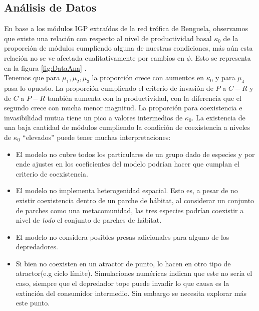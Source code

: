 \subsection{An\'alisis de Datos}
En base a los m\'odulos IGP extra\'idos de la red tr\'ofica de Benguela, observamos que existe una relaci\'on con respecto al nivel de productividad basal $\kappa_0$ de la proporci\'on de m\'odulos cumpliendo alguna de nuestras condiciones, m\'as a\'un esta relaci\'on no se ve afectada cualitativamente por cambios en $\phi$. Esto se representa en la figura \ref{fig:DataAna} . \\
Tenemos que para $\mu_1, \mu_2 , \mu_3$  la proporci\'on crece con aumentos en $\kappa_0$ y para $\mu_4$ pasa lo opuesto. La proporci\'on cumpliendo el criterio de invasi\'on de $P$ a $C-R$ y de $C$ a $P-R$ tambi\'en aumenta con la productividad, con la diferencia que el segundo crece con mucha menor magnitud. La proporci\'on para coexistencia e invasibilidad mutua tiene un pico a valores intermedios de $\kappa_0$. La existencia de una baja cantidad de m\'odulos cumpliendo la condici\'on de coexistencia a niveles de $\kappa_0$ ``elevados'' puede tener muchas interpretaciones:
\begin{itemize}
\item  El modelo no cubre todos los particulares de un grupo dado de especies y por ende ajustes en los coeficientes del modelo podr\'ian hacer que cumplan el criterio de coexistencia.
\item El modelo no implementa heterogenidad espacial. Esto es, a pesar de no existir coexistencia dentro de un parche de h\'abitat, al considerar un conjunto de parches como una metacomunidad, las tres especies podr\'ian coexistir a nivel de \emph{todo} el conjunto de parches de h\'abitat.
\item El modelo no considera posibles presas adicionales para alguno de los depredadores\citep{holt2007alternative}.
\item Si bien no coexisten en un atractor de punto, lo hacen en otro tipo de atractor(e.g ciclo l\'imite). Simulaciones num\'ericas indican que este no ser\'ia el caso, siempre que el depredador tope puede invadir lo que causa es la extinci\'on del consumidor intermedio. Sin embargo se necesita explorar m\'as este punto. 
\end{itemize}

